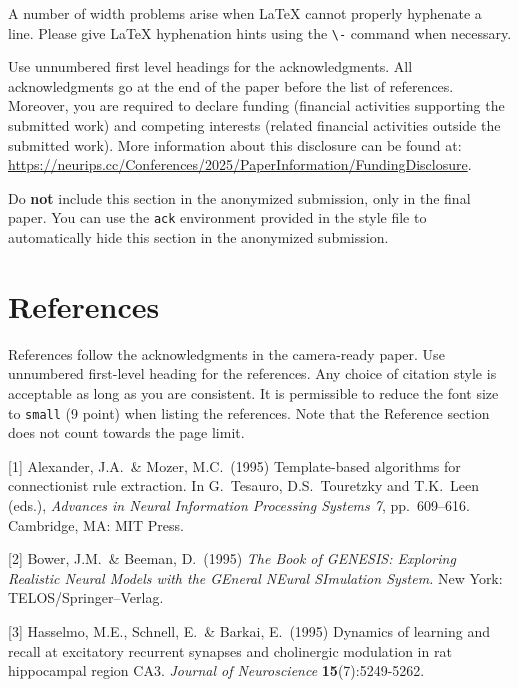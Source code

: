\documentclass{article}
\begin{document}
A number of width problems arise when \LaTeX{} cannot properly hyphenate a
line. Please give LaTeX hyphenation hints using the \verb+\-+ command when
necessary.

\begin{ack}
Use unnumbered first level headings for the acknowledgments. All acknowledgments
go at the end of the paper before the list of references. Moreover, you are required to declare
funding (financial activities supporting the submitted work) and competing interests (related financial activities outside the submitted work).
More information about this disclosure can be found at: \url{https://neurips.cc/Conferences/2025/PaperInformation/FundingDisclosure}.


Do {\bf not} include this section in the anonymized submission, only in the final paper. You can use the \texttt{ack} environment provided in the style file to automatically hide this section in the anonymized submission.
\end{ack}

\section*{References}


References follow the acknowledgments in the camera-ready paper. Use unnumbered first-level heading for
the references. Any choice of citation style is acceptable as long as you are
consistent. It is permissible to reduce the font size to \verb+small+ (9 point)
when listing the references.
Note that the Reference section does not count towards the page limit.
\medskip


{
\small


[1] Alexander, J.A.\ \& Mozer, M.C.\ (1995) Template-based algorithms for
connectionist rule extraction. In G.\ Tesauro, D.S.\ Touretzky and T.K.\ Leen
(eds.), {\it Advances in Neural Information Processing Systems 7},
pp.\ 609--616. Cambridge, MA: MIT Press.


[2] Bower, J.M.\ \& Beeman, D.\ (1995) {\it The Book of GENESIS: Exploring
  Realistic Neural Models with the GEneral NEural SImulation System.}  New York:
TELOS/Springer--Verlag.


[3] Hasselmo, M.E., Schnell, E.\ \& Barkai, E.\ (1995) Dynamics of learning and
recall at excitatory recurrent synapses and cholinergic modulation in rat
hippocampal region CA3. {\it Journal of Neuroscience} {\bf 15}(7):5249-5262.
}


\end{document}
